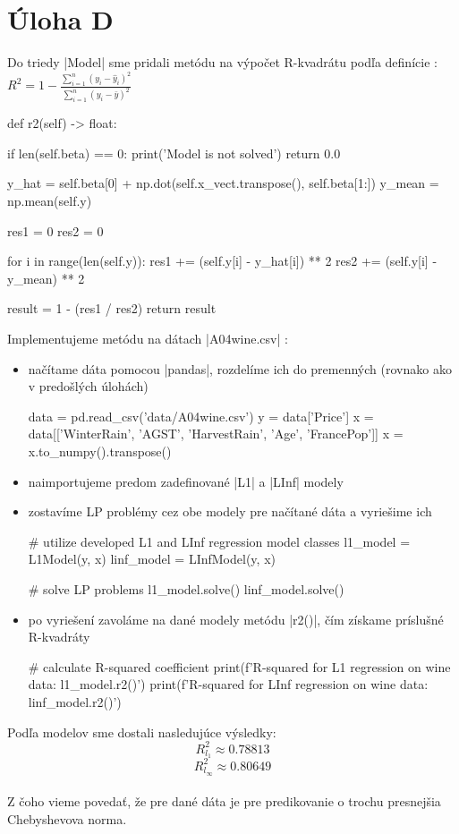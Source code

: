 \documentclass[12pt,oneside,a4paper,slovak]{article}
\begin{document}
   

\section*{Úloha D}
Do triedy \pyth|Model| sme pridali metódu na výpočet R-kvadrátu podľa definície :\\
\begin{math}
R^2 = 1 - \frac{\sum_{i=1}^{n} (y_i - \hat{y}_i)^2}{\sum_{i=1}^{n} (y_i - \bar{y})^2}
\end{math}
\\
\begin{python}
def r2(self) -> float:

        if len(self.beta) == 0:
            print('Model is not solved')
            return 0.0

        y_hat = self.beta[0] + np.dot(self.x_vect.transpose(), self.beta[1:])
        y_mean = np.mean(self.y)

        res1 = 0
        res2 = 0

        for i in range(len(self.y)):
            res1 += (self.y[i] - y_hat[i]) ** 2
            res2 += (self.y[i] - y_mean) ** 2

        result = 1 - (res1 / res2)
        return result
\end{python}
Implementujeme metódu na dátach \pyth|A04wine.csv| :
\begin{itemize}
	\item načítame dáta pomocou \pyth|pandas|, rozdelíme ich do premenných (rovnako ako v predošlých úlohách)
	\begin{python}
	data = pd.read_csv('data/A04wine.csv')
	y = data['Price']
	x = data[['WinterRain', 'AGST', 'HarvestRain', 'Age', 'FrancePop']]
	x = x.to_numpy().transpose()
	\end{python}
	\item naimportujeme predom zadefinované \pyth|L1| a \pyth|LInf| modely
	\item zostavíme LP problémy cez obe modely pre načítané dáta a vyriešime ich
	\begin{python}
	# utilize developed L1 and LInf regression model classes
	l1_model = L1Model(y, x)
	linf_model = LInfModel(y, x)
	
	# solve LP problems
	l1_model.solve()
	linf_model.solve()
	\end{python}
	\item po vyriešení zavoláme na dané modely metódu \pyth|r2()|, čím získame príslušné R-kvadráty
	\begin{python}
	# calculate R-squared coefficient
	print(f'R-squared for L1 regression on wine data: {l1_model.r2()}')      
	print(f'R-squared for LInf regression on wine data: {linf_model.r2()}')   
	\end{python}
\end{itemize}
Podľa modelov sme dostali nasledujúce výsledky:
\\
\begin{equation*}R^{2}_{l_1} \approx  0.78813\end{equation*}
\begin{equation*}R^{2}_{l_{\infty}} \approx 0.80649\end{equation*}
\\
Z čoho vieme povedať, že pre dané dáta je pre predikovanie o trochu presnejšia Chebyshevova norma.
\end{document}
